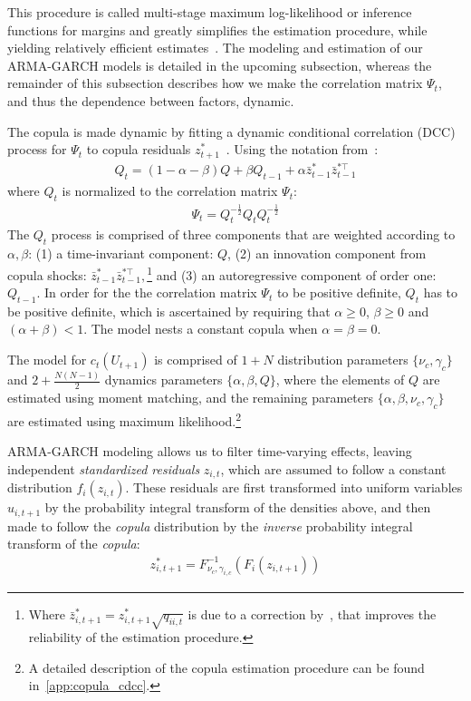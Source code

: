 This procedure is called multi-stage maximum log-likelihood or inference functions for margins and greatly simplifies the estimation procedure, while yielding relatively efficient estimates~\autocite{Patton2006,Joe1997}. The modeling and estimation of our ARMA-GARCH models is detailed in the upcoming subsection, whereas the remainder of this subsection describes how we make the correlation matrix $\Psi_t$, and thus the dependence between factors, dynamic.

The copula is made dynamic by fitting a dynamic conditional correlation (DCC) process for $\Psi_t$ to copula residuals $z_{t+1}^*$~\autocite{Engle2002}. Using the notation from~\textcite{ChristoffersenLanglois2013}:
\begin{align}
  Q_t = (1 - \alpha - \beta) Q
    + \beta Q_{t-1}
    + \alpha \bar{z}_{t-1}^* \bar{z}_{t-1}^{*\top}
  \label{eq:copula_cdcc}
\end{align}
where $Q_t$ is normalized to the correlation matrix $\Psi_t$:
\begin{align}
  \Psi_t = Q_t^{-\frac{1}{2}} Q_t Q_t^{-\frac{1}{2}}
  \label{eq:copula_cdcc_psi}
\end{align}
The $Q_t$ process is comprised of three components that are weighted according to $\alpha, \beta$: (1) a time-invariant component: $Q$, (2) an innovation component from copula shocks: $\bar{z}_{t-1}^{*} \bar{z}_{t-1}^{*\top},$\footnote{Where $\bar{z}_{i,t+1}^* = z_{i,t+1}^* \sqrt{q_{ii,t}}$ is due to a correction by~\textcite{Aielli2013}, that improves the reliability of the estimation procedure.} and (3) an autoregressive component of order one: $Q_{t-1}$. In order for the the correlation matrix $\Psi_t$ to be positive definite, $Q_t$ has to be positive definite, which is ascertained by requiring that $\alpha \geq 0$, $\beta \geq 0$ and $(\alpha + \beta) < 1$. The model nests a constant copula when $\alpha = \beta = 0$.

The model for $c_t(U_{t+1})$ is comprised of $1 + N$ distribution parameters $\{\nu_c, \gamma_c\}$ and $2 + \frac{N(N-1)}{2}$ dynamics parameters $\{\alpha, \beta, Q\}$, where the elements of $Q$ are estimated using moment matching, and the remaining parameters $\{\alpha, \beta, \nu_c, \gamma_c\}$ are estimated using maximum likelihood.\footnote{A detailed description of the copula estimation procedure can be found in~\autoref{app:copula_cdcc}.}

ARMA-GARCH modeling allows us to filter time-varying effects, leaving independent \emph{standardized residuals} $z_{i,t}$, which are assumed to follow a constant distribution $f_i(z_{i,t})$. These residuals are first transformed into uniform variables $u_{i,t+1}$ by the probability integral transform of the densities above, and then made to follow the \emph{copula} distribution by the \emph{inverse} probability integral transform of the \emph{copula}:
\begin{align}
  z_{i,t+1}^* = F^{-1}_{\nu_c,\gamma_{i,c}}(F_{i}(z_{i,t+1}))
\end{align}

